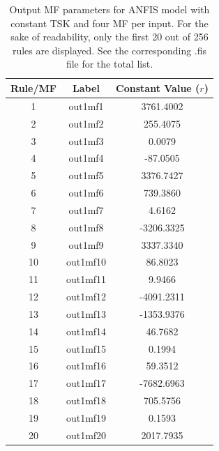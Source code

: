 \documentclass[12pt]{article}
\begin{document}
\begin{table}[H]
\centering
\begin{tabular}{|c|c|c|}
\hline
\textbf{Rule/MF} & \textbf{Label} & \textbf{Constant Value ($r$)} \\ \hline
1 & out1mf1 & 3761.4002 \\ \hline
2 & out1mf2 & 255.4075 \\ \hline
3 & out1mf3 & 0.0079 \\ \hline
4 & out1mf4 & -87.0505 \\ \hline
5 & out1mf5 & 3376.7427 \\ \hline
6 & out1mf6 & 739.3860 \\ \hline
7 & out1mf7 & 4.6162 \\ \hline
8 & out1mf8 & -3206.3325 \\ \hline
9 & out1mf9 & 3337.3340 \\ \hline
10 & out1mf10 & 86.8023 \\ \hline
11 & out1mf11 & 9.9466 \\ \hline
12 & out1mf12 & -4091.2311 \\ \hline
13 & out1mf13 & -1353.9376 \\ \hline
14 & out1mf14 & 46.7682 \\ \hline
15 & out1mf15 & 0.1994 \\ \hline
16 & out1mf16 & 59.3512 \\ \hline
17 & out1mf17 & -7682.6963 \\ \hline
18 & out1mf18 & 705.5756 \\ \hline
19 & out1mf19 & 0.1593 \\ \hline
20 & out1mf20 & 2017.7935 \\ \hline
\end{tabular}
\caption{Output MF parameters for ANFIS model with constant TSK and four MF per input. 
For the sake of readability, only the first 20 out of 256 rules are displayed. 
See the corresponding .fis file for the total list. }
\end{table}
\end{document}

